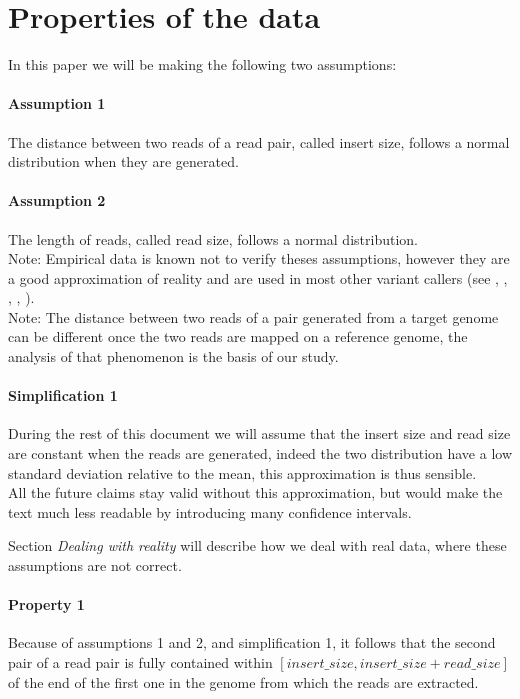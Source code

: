 \documentclass{article}
\begin{document}
\section{Properties of the data}

In this paper we will be making the following two assumptions:

\paragraph{Assumption 1} The distance between two reads of a read pair, called insert size, follows a normal distribution when they are generated.
\paragraph{Assumption 2} The length of reads, called read size, follows a normal distribution.\\
Note: Empirical data is known not to verify theses assumptions, however they are a good approximation of reality and are used in most other variant callers (see \cite{ rausch_delly:_2012}, \cite{ye_pindel:_2009}, \cite{chen_manta:_2016}, \cite{handsaker_large_2015}, \cite{chen_breakdancer:_2009}).\\
Note: The distance between two reads of a pair generated from a target genome can be different once the two reads are mapped on a reference genome, the analysis of that phenomenon is the basis of our study.

\paragraph{Simplification 1} During the rest of this document we will assume that the insert size and read size are constant when the reads are generated, indeed the two distribution have a low standard deviation relative to the mean, this approximation is thus sensible.\\
All the future claims stay valid without this approximation, but would make the text much less readable by introducing many confidence intervals.

Section \emph{Dealing with reality} will describe how we deal with real data, where these assumptions are not correct.

\paragraph{Property 1} Because of assumptions 1 and 2, and simplification 1, it follows that the second pair of a read pair is fully contained within $[insert\_size, insert\_size + read\_size]$ of the end of the first one in the genome from which the reads are extracted.
\end{document}
